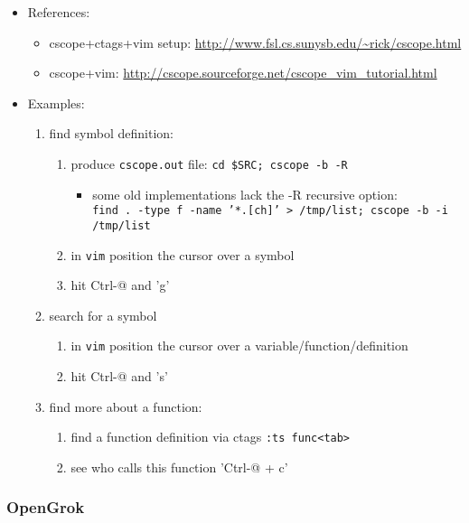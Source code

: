\begin{itemize}
\item References:
\begin{itemize}
  \item cscope+ctags+vim setup:
     \url{http://www.fsl.cs.sunysb.edu/~rick/cscope.html}
  \item cscope+vim:
     \url{http://cscope.sourceforge.net/cscope\_vim\_tutorial.html}
\end{itemize}
\item Examples:
\begin{enumerate}
      \item find symbol definition:
        \begin{enumerate}
        \item produce \texttt{cscope.out} file:
        \texttt{cd \$SRC; cscope -b -R}
	  \begin{itemize}
	  \item some old implementations lack the -R recursive option: \\
	    \texttt{find . -type f -name '*.[ch]' > /tmp/list; cscope -b -i /tmp/list}
	  \end{itemize}
        \item in \texttt{vim} position the cursor over a symbol
        \item hit Ctrl-@ and 'g'
        \end{enumerate}
      \item search for a symbol
        \begin{enumerate}
        \item in \texttt{vim} position the cursor over a
            variable/function/definition
        \item hit Ctrl-@ and 's'
        \end{enumerate}
      \item find more about a function:
        \begin{enumerate}
        \item find a function definition via ctags \texttt{:ts func<tab>}
        \item see who calls this function 'Ctrl-@ + c'
        \end{enumerate}
\end{enumerate}
\end{itemize}

\subsubsection{OpenGrok}

